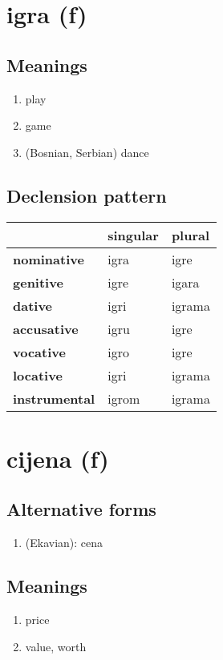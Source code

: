 \filbreak
\section{igra (f)}
\subsection*{Meanings}
\begin{enumerate}
\item play
\item game
\item (Bosnian, Serbian) dance
\end{enumerate}
\subsection*{Declension pattern}
\begin{tabularx}{\linewidth}{Xll}
\toprule
{} & singular &  plural \\
\midrule
\textbf{nominative  } &     igra &    igre \\
\textbf{genitive    } &     igre &   igara \\
\textbf{dative      } &     igri &  igrama \\
\textbf{accusative  } &     igru &    igre \\
\textbf{vocative    } &     igro &    igre \\
\textbf{locative    } &     igri &  igrama \\
\textbf{instrumental} &    igrom &  igrama \\
\bottomrule
\end{tabularx}

\filbreak
\section{cijena (f)}
\subsection*{Alternative forms}
\begin{enumerate}
\item (Ekavian): cena
\end{enumerate}
\subsection*{Meanings}
\begin{enumerate}
\item price
\item value, worth
\end{enumerate}
